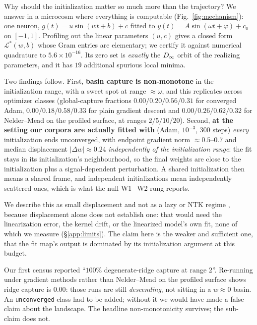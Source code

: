 Why should the initialization matter so much more than the trajectory? We answer in a microcosm
where everything is computable (Fig.~\ref{fig:mechanism}): one neuron, $g(t) = u\sin(wt+b)+c$ fitted to
$y(t) = A\sin(\omega t + \varphi) + c_0$ on $[-1,1]$. Profiling out the linear parameters
$(u,c)$ gives a closed form $\mathcal{L}^*(w,b)$ whose Gram entries are elementary; we certify it
against numerical quadrature to $5.6\times10^{-16}$. Its zero set is \emph{exactly} the $D_\infty$
orbit of the realizing parameters, and it has $19$ additional spurious local minima.

Two findings follow. First, \textbf{basin capture is non-monotone} in the initialization range,
with a sweet spot at range $\approx \omega$, and this replicates across optimizer classes
(global-capture fractions $0.00/0.20/0.56/0.31$ for converged Adam, $0.00/0.18/0.58/0.33$ for
plain gradient descent and $0.00/0.26/0.62/0.32$ for Nelder--Mead on the profiled surface, at
ranges $2/5/10/20$). Second, \textbf{at the setting our corpora are actually fitted with}
(Adam, $10^{-3}$, $300$ steps) \emph{every} initialization ends unconverged, with endpoint
gradient norm $\approx 0.5$--$0.7$ and median displacement $|\Delta w| \approx 0.24$
\emph{independently of the initialization range}: the fit stays in its initialization's
neighbourhood, so the final weights are close to the initialization plus a signal-dependent
perturbation. A shared initialization then means a shared frame, and independent initializations
mean independently scattered ones, which is what the null W1$-$W2 rung reports.

We describe this as small displacement and not as a lazy or NTK regime
\citep{jacot2018ntk,chizat2019lazy}, because displacement alone does not establish one: that would
need the linearization error, the kernel drift, or the linearized model's own fit, none of which we
measure (\S\ref{app:limits}). The claim here is the weaker and sufficient one, that the fit map's output is dominated by its initialization argument at this budget.

\begin{remark}
Our first census reported ``$100\%$ degenerate-ridge capture at range $2$''. Re-running under
gradient methods rather than Nelder--Mead on the profiled surface shows ridge capture is $0.00$:
those runs are still \emph{descending}, not sitting in a $w\approx0$ basin. An
\texttt{unconverged} class had to be added; without it we would have made a false claim about the
landscape. The headline non-monotonicity survives; the sub-claim does not.
\end{remark}

